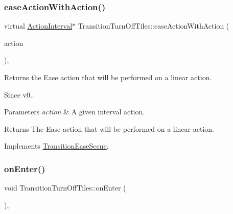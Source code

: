 \subsubsection{\texorpdfstring{ease\+Action\+With\+Action()}{easeActionWithAction()}\hspace{0.1cm}{\footnotesize\ttfamily [2/2]}}
{\footnotesize\ttfamily virtual \hyperlink{classActionInterval}{Action\+Interval}$\ast$ Transition\+Turn\+Off\+Tiles\+::ease\+Action\+With\+Action (\begin{DoxyParamCaption}\item[{\hyperlink{classActionInterval}{Action\+Interval} $\ast$}]{action }\end{DoxyParamCaption})\hspace{0.3cm}{\ttfamily [override]}, {\ttfamily [virtual]}}

Returns the Ease action that will be performed on a linear action. \begin{DoxySince}{Since}
v0..
\end{DoxySince}

\begin{DoxyParams}{Parameters}
{\em action} & A given interval action. \\
\hline
\end{DoxyParams}
\begin{DoxyReturn}{Returns}
The Ease action that will be performed on a linear action. 
\end{DoxyReturn}


Implements \hyperlink{classTransitionEaseScene_a6f27540600b0d703ed30adc8976e65df}{Transition\+Ease\+Scene}.

\mbox{\label{classTransitionTurnOffTiles_ae0dc8ca8038400db02d3ed87a594481a}} 
\subsubsection{\texorpdfstring{on\+Enter()}{onEnter()}\hspace{0.1cm}{\footnotesize\ttfamily [1/2]}}
{\footnotesize\ttfamily void Transition\+Turn\+Off\+Tiles\+::on\+Enter (\begin{DoxyParamCaption}\item[{void}]{ }\end{DoxyParamCaption})\hspace{0.3cm}{\ttfamily [override]}, {\ttfamily [virtual]}}

